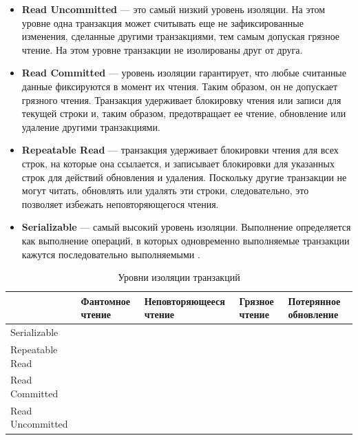\begin{itemize}
    \item 
        \textbf{Read Uncommitted} — это самый низкий уровень изоляции. На этом уровне одна транзакция может считывать еще не зафиксированные изменения, сделанные другими транзакциями, тем самым допуская грязное чтение. На этом уровне транзакции не изолированы друг от друга.
    \item 
        \textbf{Read Committed} — уровень изоляции гарантирует, что любые считанные данные фиксируются в момент их чтения. Таким образом, он не допускает грязного чтения. Транзакция удерживает блокировку чтения или записи для текущей строки и, таким образом, предотвращает ее чтение, обновление или удаление другими транзакциями.
    \item 
        \textbf{Repeatable Read} — транзакция удерживает блокировки чтения для всех строк, на которые она ссылается, и записывает блокировки для указанных строк для действий обновления и удаления. Поскольку другие транзакции не могут читать, обновлять или удалять эти строки, следовательно, это позволяет избежать неповторяющегося чтения.
    \item 
        \textbf{Serializable} — самый высокий уровень изоляции. Выполнение определяется как выполнение операций, в которых одновременно выполняемые транзакции кажутся последовательно выполняемыми \autocite{BeginningSQL}.
\end{itemize}

\begin{table}[h]
\begin{tabularx}{\textwidth}{|X|X|X|X|X|}
    \hline
                     & Фантомное чтение         & Неповторяющееся чтение   & Грязное чтение           & Потерянное обновление    \\ \hline
    Serializable     & \cellcolor[HTML]{32CB00} & \cellcolor[HTML]{32CB00} & \cellcolor[HTML]{32CB00} & \cellcolor[HTML]{32CB00} \\ \hline
    Repeatable Read  & \cellcolor[HTML]{FE0000} & \cellcolor[HTML]{32CB00} & \cellcolor[HTML]{32CB00} & \cellcolor[HTML]{32CB00} \\ \hline
    Read Committed   & \cellcolor[HTML]{FE0000} & \cellcolor[HTML]{FE0000} & \cellcolor[HTML]{32CB00} & \cellcolor[HTML]{32CB00} \\ \hline
    Read Uncommitted & \cellcolor[HTML]{FE0000} & \cellcolor[HTML]{FE0000} & \cellcolor[HTML]{FE0000} & \cellcolor[HTML]{32CB00} \\ \hline
\end{tabularx}
\caption{Уровни изоляции транзакций}
\end{table}


